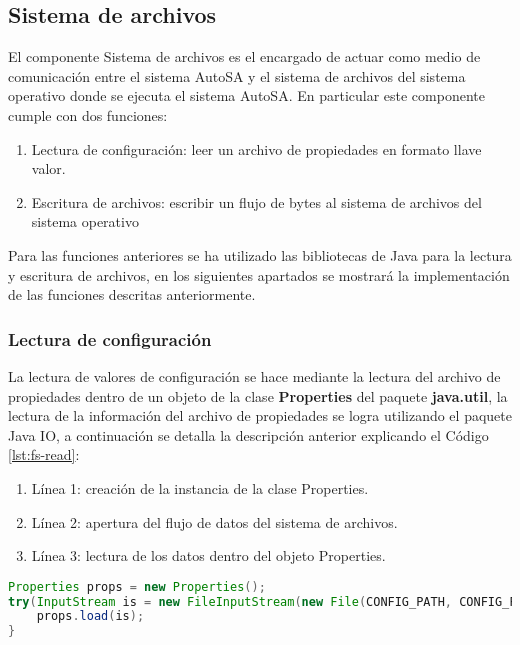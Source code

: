 \subsection{Sistema de archivos}
El componente Sistema de archivos es el encargado de actuar como medio de comunicación entre el sistema AutoSA y el sistema de archivos del sistema operativo donde se ejecuta el sistema AutoSA. En particular este componente cumple con dos funciones:
\begin{enumerate}
	\item Lectura de configuración: leer un archivo de propiedades en formato llave valor.
	\item Escritura de archivos: escribir un flujo de bytes al sistema de archivos del sistema operativo
\end{enumerate}
Para las funciones anteriores se ha utilizado las bibliotecas de Java para la lectura y escritura de archivos, en los siguientes apartados se mostrará la implementación de las funciones descritas anteriormente.

\subsubsection{Lectura de configuración}
La lectura de valores de configuración se hace mediante la lectura del archivo de propiedades dentro de un objeto de la clase \textbf{Properties} del paquete \textbf{java.util}, la lectura de la información del archivo de propiedades se logra utilizando el paquete Java IO, a continuación se detalla la descripción anterior explicando el Código \ref{lst:fs-read}:

\begin{enumerate}
 	\item Línea 1: creación de la instancia de la clase Properties.
 	\item Línea 2: apertura del flujo de datos del sistema de archivos.
 	\item Línea 3: lectura de los datos dentro del objeto Properties.
 \end{enumerate}

\begin{lstlisting}[language=Java, caption={Lectura de un archivo de propiedades.}, captionpos=b, label={lst:fs-read}]
Properties props = new Properties();
try(InputStream is = new FileInputStream(new File(CONFIG_PATH, CONFIG_FILENAME));){
	props.load(is);
}
\end{lstlisting}

